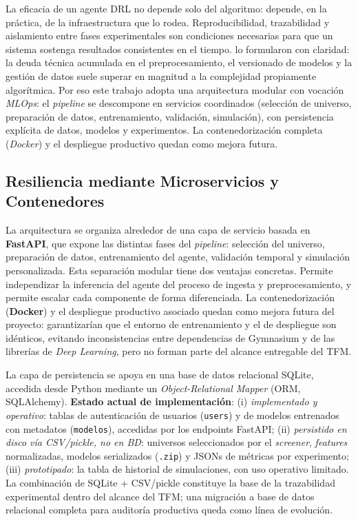 \documentclass[IB,a4paper]{TFUOC}
\begin{document}
La eficacia de un agente DRL no depende solo del algoritmo: depende, en la práctica, de la infraestructura que lo rodea. Reproducibilidad, trazabilidad y aislamiento entre fases experimentales son condiciones necesarias para que un sistema sostenga resultados consistentes en el tiempo. \citet{sculley2015hidden} lo formularon con claridad: la deuda técnica acumulada en el preprocesamiento, el versionado de modelos y la gestión de datos suele superar en magnitud a la complejidad propiamente algorítmica. Por eso este trabajo adopta una arquitectura modular con vocación \textit{MLOps}: el \textit{pipeline} se descompone en servicios coordinados (selección de universo, preparación de datos, entrenamiento, validación, simulación), con persistencia explícita de datos, modelos y experimentos. La contenedorización completa (\textit{Docker}) y el despliegue productivo quedan como mejora futura.

\subsection{Resiliencia mediante Microservicios y Contenedores}

La arquitectura se organiza alrededor de una capa de servicio basada en \textbf{FastAPI}, que expone las distintas fases del \textit{pipeline}: selección del universo, preparación de datos, entrenamiento del agente, validación temporal y simulación personalizada. Esta separación modular tiene dos ventajas concretas. Permite independizar la inferencia del agente del proceso de ingesta y preprocesamiento, y permite escalar cada componente de forma diferenciada. La contenedorización (\textbf{Docker}) y el despliegue productivo asociado quedan como mejora futura del proyecto: garantizarían que el entorno de entrenamiento y el de despliegue son idénticos, evitando inconsistencias entre dependencias de Gymnasium y de las librerías de \textit{Deep Learning}, pero no forman parte del alcance entregable del TFM.

La capa de persistencia se apoya en una base de datos relacional SQLite, accedida desde Python mediante un \textit{Object-Relational Mapper} (ORM, SQLAlchemy). \textbf{Estado actual de implementación}: (i) \textit{implementado y operativo}: tablas de autenticación de usuarios (\texttt{users}) y de modelos entrenados con metadatos (\texttt{modelos}), accedidas por los endpoints FastAPI; (ii) \textit{persistido en disco vía CSV/pickle, no en BD}: universos seleccionados por el \textit{screener}, \textit{features} normalizadas, modelos serializados (\texttt{.zip}) y JSONs de métricas por experimento; (iii) \textit{prototipado}: la tabla de historial de simulaciones, con uso operativo limitado. La combinación de SQLite + CSV/pickle constituye la base de la trazabilidad experimental dentro del alcance del TFM; una migración a base de datos relacional completa para auditoría productiva queda como línea de evolución.
\end{document}
